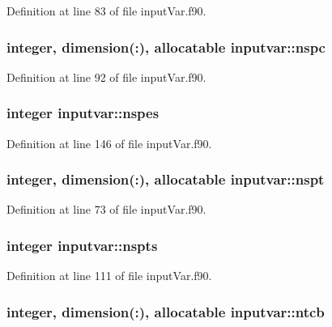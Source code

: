 Definition at line 83 of file input\-Var.\-f90.

\hypertarget{classinputvar_aad6ce13b0378ba79e193cb3738e2d938}{
\subsubsection[{nspc}]{\setlength{\rightskip}{0pt plus 5cm}integer, dimension(\-:), allocatable inputvar\-::nspc}}\label{classinputvar_aad6ce13b0378ba79e193cb3738e2d938}


Definition at line 92 of file input\-Var.\-f90.

\hypertarget{classinputvar_a253d7296c6c1f21cd53ed05721bcbbc3}{
\subsubsection[{nspes}]{\setlength{\rightskip}{0pt plus 5cm}integer inputvar\-::nspes}}\label{classinputvar_a253d7296c6c1f21cd53ed05721bcbbc3}


Definition at line 146 of file input\-Var.\-f90.

\hypertarget{classinputvar_a0c86e9a7915872ee547e5bd8802611e7}{
\subsubsection[{nspt}]{\setlength{\rightskip}{0pt plus 5cm}integer, dimension(\-:), allocatable inputvar\-::nspt}}\label{classinputvar_a0c86e9a7915872ee547e5bd8802611e7}


Definition at line 73 of file input\-Var.\-f90.

\hypertarget{classinputvar_aaefd22e32dc26863fb189c2a0305ac3b}{
\subsubsection[{nspts}]{\setlength{\rightskip}{0pt plus 5cm}integer inputvar\-::nspts}}\label{classinputvar_aaefd22e32dc26863fb189c2a0305ac3b}


Definition at line 111 of file input\-Var.\-f90.

\hypertarget{classinputvar_a41aaaf97cb1f1e815c73bcfa5f975be3}{
\subsubsection[{ntcb}]{\setlength{\rightskip}{0pt plus 5cm}integer, dimension(\-:), allocatable inputvar\-::ntcb}}\label{classinputvar_a41aaaf97cb1f1e815c73bcfa5f975be3}


